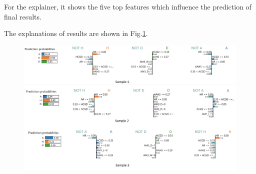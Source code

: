 \documentclass{article}
\begin{document}
For the explainer, it shows the five top features which influence the prediction of final results.

The explanations of results are shown in Fig.\ref{fig:LIMEresult}.

\begin{figure}[ht]
\centering
\includegraphics[scale=0.4]{graphs/LIMEresult.png}
\caption{}
\label{fig:LIMEresult}
\end{figure}
\end{document}
